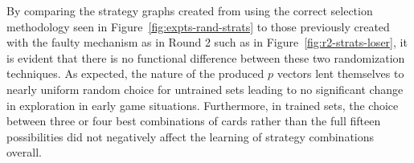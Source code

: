 By comparing the strategy graphs created from using the correct selection
methodology seen in Figure~\ref{fig:expts-rand-strats}
to those previously created with the faulty mechanism as in Round 2
such as in Figure~\ref{fig:r2-strats-loser},
it is evident that there is no functional difference between these two
randomization techniques.
%
As expected,
the nature of the produced $p$ vectors lent themselves to nearly uniform random
choice for untrained sets leading to no significant change in exploration in
early game situations.
%
Furthermore,
in trained sets,
the choice between three or four best combinations of cards rather than
the full fifteen possibilities did not negatively affect the learning of
strategy combinations overall.



